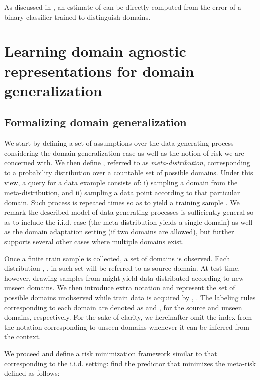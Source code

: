 \documentclass{article}
\begin{document}
As discussed in \cite{ben2007analysis}, an estimate of  can be directly computed from the error of a binary classifier trained to distinguish domains.

\section{Learning domain agnostic representations for domain generalization}\label{sec:method}

\subsection{Formalizing domain generalization}

We start by defining a set of assumptions over the data generating process considering the domain generalization case as well as the notion of risk we are concerned with. We then define , referred to as \emph{meta-distribution}, corresponding to a probability distribution over a countable set of possible domains. Under this view, a query for a data example consists of: i) sampling a domain from the meta-distribution, and ii) sampling a data point according to that particular domain. Such process is repeated  times so as to yield a training sample . We remark the described model of data generating processes is sufficiently general so as to include the i.i.d. case (the meta-distribution yields a single domain) as well as the domain adaptation setting (if two domains are allowed), but further supports several other cases where multiple domains exist.

Once a finite train sample is collected, a set of  domains is observed. Each distribution , , in such set will be referred to as source domain. At test time, however, drawing samples from  might yield data distributed according to new unseen domains. We then introduce extra notation and represent the set of possible domains unobserved while train data is acquired by , . The labeling rules corresponding to each domain are denoted as  and , for the source and unseen domains, respectively. For the sake of clarity, we hereinafter omit the index from the notation corresponding to unseen domains whenever it can be inferred from the context.


We proceed and define a risk minimization framework similar to that corresponding to the i.i.d. setting: find the predictor  that minimizes the meta-risk  defined as follows: 
\end{document}
